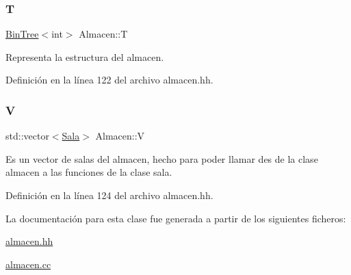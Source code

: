 \subsubsection{\texorpdfstring{T}{T}}
{\footnotesize\ttfamily \mbox{\hyperlink{class_bin_tree}{Bin\+Tree}}$<$int$>$ Almacen\+::T\hspace{0.3cm}{\ttfamily [private]}}



Representa la estructura del almacen. 



Definición en la línea 122 del archivo almacen.\+hh.

\mbox{\label{class_almacen_a76cad3a8f2f670e26d7ceb827f7f9e69}} 
\subsubsection{\texorpdfstring{V}{V}}
{\footnotesize\ttfamily std\+::vector$<$\mbox{\hyperlink{class_sala}{Sala}}$>$ Almacen\+::V\hspace{0.3cm}{\ttfamily [private]}}



Es un vector de salas del almacen, hecho para poder llamar des de la clase almacen a las funciones de la clase sala. 



Definición en la línea 124 del archivo almacen.\+hh.



La documentación para esta clase fue generada a partir de los siguientes ficheros\+:\begin{DoxyCompactItemize}
\item 
\mbox{\hyperlink{almacen_8hh}{almacen.\+hh}}\item 
\mbox{\hyperlink{almacen_8cc}{almacen.\+cc}}\end{DoxyCompactItemize}
